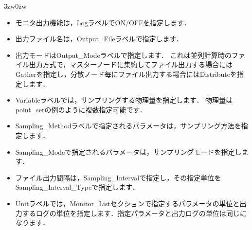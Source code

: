 \begin{indentation}{3zw}{0zw}
\begin{itemize}
\item モニタ出力機能は，LogラベルでON/OFFを指定します．
\item 出力ファイル名は，Output\_Fileラベルで指定します．
\item 出力モードはOutput\_Modeラベルで指定します．
これは並列計算時のファイル出力方式で，マスターノードに集約してファイル出力する場合にはGatherを指定し，分散ノード毎にファイル出力する場合にはDistributeを指定します．
\item Variableラベルでは，サンプリングする物理量を指定します．
物理量はpoint\_setの例のように複数指定可能です．
\item Sampling\_Methodラベルで指定されるパラメータは，サンプリング方法を指定します．
\item Sampling\_Modeで指定されるパラメータは，サンプリングモードを指定します．
\item ファイル出力間隔は，Sampling\_Intervalで指定し，その指定単位をSampling\_Interval\_Typeで指定します．
\item Unitラベルでは，Monitor\_Listセクションで指定するパラメータの単位と出力するログの単位を指定します．指定パラメータと出力ログの単位は同じになります．
\end{itemize}

\end{indentation}

